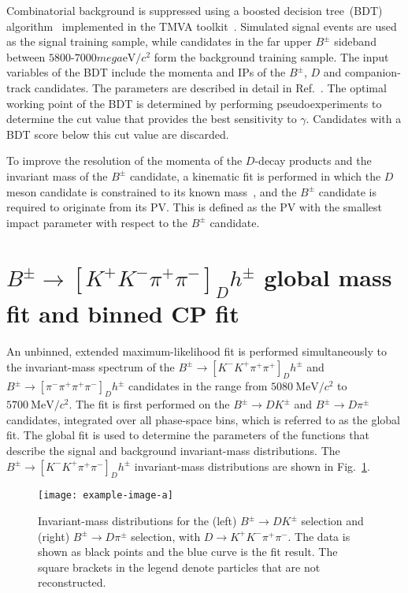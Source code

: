 \documentclass[12pt, a4paper, notitlepage, onecolumn]{article}
\begin{document}
Combinatorial background is suppressed using a boosted decision tree~(BDT) algorithm~\cite{Breiman,AdaBoost} implemented in the TMVA toolkit~\cite{Hocker:2007ht,*TMVA4}. Simulated signal events are used as the signal training sample, while candidates in the far upper $B^\pm$ sideband between $5800$-$7000\si{mega\eV/c^2}$ form the background training sample. The input variables of the BDT include the momenta and IPs of the $B^\pm$, $D$ and companion-track candidates. The parameters are described in detail in Ref.~\cite{LHCb-PAPER-2018-017}. The optimal working point of the BDT is determined by performing pseudoexperiments to determine the cut value that provides the best sensitivity to $\gamma$. Candidates with a BDT score below this cut value are discarded.

To improve the resolution of the momenta of the $D$-decay products and the invariant mass of the $B^\pm$ candidate, a kinematic fit is performed in which the $D$ meson candidate is constrained to its known mass~\cite{PDG2022}, and the $B^\pm$ candidate is required to originate from its PV. This is defined as the PV with the smallest impact parameter with respect to the $B^\pm$ candidate.

\section{\texorpdfstring{$B^\pm\to[K^+K^-\pi^+\pi^-]_Dh^\pm$}{B2DhD2KKpipi} global mass fit and binned CP fit}
\noindent An unbinned, extended maximum-likelihood fit is performed simultaneously to the invariant-mass spectrum of the $B^\pm\to[K^-K^+\pi^+\pi^+]_Dh^\pm$ and $B^\pm\to[\pi^-\pi^+\pi^+\pi^-]_Dh^\pm$ candidates in the range from $\SI{5080}{\mega\eV/c^2}$ to $\SI{5700}{\mega\eV/c^2}$. The fit is first performed on the $B^\pm\to DK^\pm$ and $B^\pm\to D\pi^\pm$ candidates, integrated over all phase-space bins, which is referred to as the global fit. The global fit is used to determine the parameters of the functions that describe the signal and background invariant-mass distributions. The $B^\pm\to[K^-K^+\pi^+\pi^-]_Dh^\pm$ invariant-mass distributions are shown in Fig.~\ref{figure:Global_fit}.

\begin{figure}[tb]
    \centering
    \texttt{[image: example-image-a]}
    \caption{Invariant-mass distributions for the (left) $B^\pm\to DK^\pm$ selection and (right) $B^\pm\to D\pi^\pm$ selection, with $D\to K^+K^-\pi^+\pi^-$. The data is shown as black points and the blue curve is the fit result. The square brackets in the legend denote particles that are not reconstructed.}
    \label{figure:Global_fit}
\end{figure}
\end{document}
